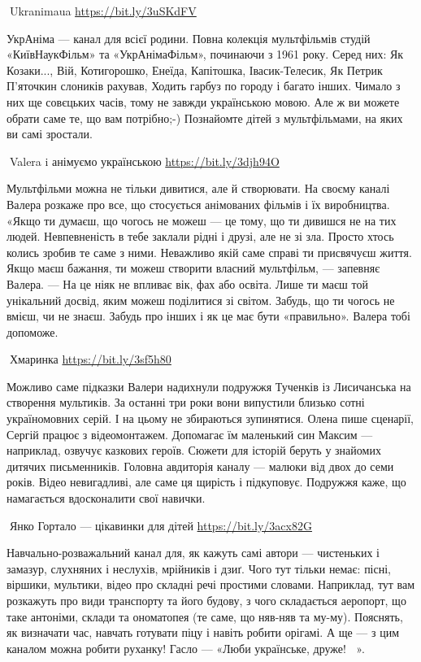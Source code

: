 🦉Ukranimaua \url{https://bit.ly/3uSKdFV}

УкрАніма — канал для всієї родини. Повна колекція мультфільмів студій
«КиївНаукФільм» та «УкрАнімаФільм», починаючи з 1961 року. Серед них: Як
Козаки..., Вій, Котигорошко, Енеїда, Капітошка, Івасик-Телесик, Як Петрик
П'яточкин слоників рахував, Ходить гарбуз по городу і багато інших. Чимало з
них ще совєцьких часів, тому не завжди українською мовою. Але ж ви можете
обрати саме те, що вам потрібно;-) Познайомте дітей з мультфільмами, на яких ви
самі зростали.

🦉Valera i анімуємо українською \url{https://bit.ly/3djh94O}

Мультфільми можна не тільки дивитися, але й створювати. На своєму каналі Валера
розкаже про все, що стосується анімованих фільмів і їх виробництва. «Якщо ти
думаєш, що чогось не можеш — це тому, що ти дивишся не на тих людей.
Невпевненість в тебе заклали рідні і друзі, але не зі зла. Просто хтось колись
зробив те саме з ними. Неважливо якій саме справі ти присвячуєш життя. Якщо
маєш бажання, ти можеш створити власний мультфільм, — запевняє Валера. — На це
ніяк не впливає вік, фах або освіта. Лише ти маєш той унікальний досвід, яким
можеш поділитися зі світом. Забудь, що ти чогось не вмієш, чи не знаєш. Забудь
про інших і як це має бути «правильно». Валера тобі допоможе.

🦉Хмаринка \url{https://bit.ly/3sf5h80}

Можливо саме підказки Валери надихнули подружжя Тученків із Лисичанська на
створення мультиків. За останні три роки вони випустили близько сотні
україномовних серій. І на цьому не збираються зупинятися. Олена пише сценарії,
Сергій працює з відеомонтажем. Допомагає їм маленький син Максим — наприклад,
озвучує казкових героїв. Сюжети для історій беруть у знайомих дитячих
письменників. Головна авдиторія каналу — малюки від двох до семи років. Відео
невигадливі, але саме ця щирість і підкуповує. Подружжя каже, що намагається
вдосконалити свої навички.

🦉Янко Гортало — цікавинки для дітей \url{https://bit.ly/3acx82G}

Навчально-розважальний канал для, як кажуть самі автори — чистеньких і замазур,
слухняних і неслухів, мрійників і дзиґ. Чого тут тільки немає: пісні, віршики,
мультики, відео про складні речі простими словами. Наприклад, тут вам розкажуть
про види транспорту та його будову, з чого складається аеропорт, що таке
антоніми, склади та ономатопея (те саме, що няв-няв та му-му). Пояснять, як
визначати час, навчать готувати піцу і навіть робити орігамі. А ще — з цим
каналом можна робити руханку! Гасло — «Люби українське, друже! 💛💙».

